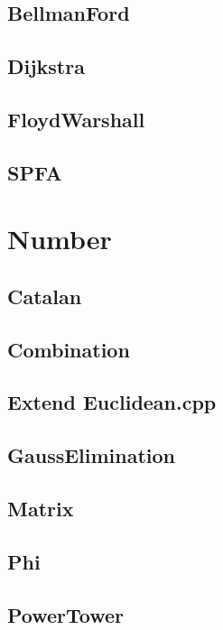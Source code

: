 \subsection{BellmanFord}

\subsection{Dijkstra}

\subsection{FloydWarshall}

\subsection{SPFA}


\section{Number}

\subsection{Catalan}

\subsection{Combination}

\subsection{Extend Euclidean.cpp}

\subsection{GaussElimination}

\subsection{Matrix}

\subsection{Phi}

\subsection{PowerTower}

